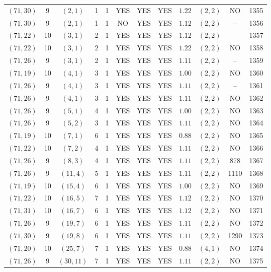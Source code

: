 \begin{longtable}{|c|c|c|c|c|c|c|c|c|c|c|c|}
$(71,30)$ & 9 & $(2,1)$ & 1 & 1 & YES & YES & YES & $1.22$ & $(2,2)$ & NO & 1355\\
$(71,30)$ & 9 & $(2,1)$ & 1 & 1 & NO & YES & YES & $1.12$ & $(2,2)$ & -- & 1356\\
$(71,22)$ & 10 & $(3,1)$ & 2 & 1 & YES & YES & YES & $1.12$ & $(2,2)$ & -- & 1357\\
$(71,22)$ & 10 & $(3,1)$ & 2 & 1 & YES & YES & YES & $1.22$ & $(2,2)$ & NO & 1358\\
$(71,26)$ & 9 & $(3,1)$ & 2 & 1 & YES & YES & YES & $1.11$ & $(2,2)$ & -- & 1359\\
$(71,19)$ & 10 & $(4,1)$ & 3 & 1 & YES & YES & YES & $1.00$ & $(2,2)$ & NO & 1360\\
$(71,26)$ & 9 & $(4,1)$ & 3 & 1 & YES & YES & YES & $1.11$ & $(2,2)$ & -- & 1361\\
$(71,26)$ & 9 & $(4,1)$ & 3 & 1 & YES & YES & YES & $1.11$ & $(2,2)$ & NO & 1362\\
$(71,26)$ & 9 & $(5,1)$ & 4 & 1 & YES & YES & YES & $1.00$ & $(2,2)$ & NO & 1363\\
$(71,26)$ & 9 & $(5,2)$ & 3 & 1 & YES & YES & YES & $1.11$ & $(2,2)$ & NO & 1364\\
$(71,19)$ & 10 & $(7,1)$ & 6 & 1 & YES & YES & YES & $0.88$ & $(2,2)$ & NO & 1365\\
$(71,22)$ & 10 & $(7,2)$ & 4 & 1 & YES & YES & YES & $1.11$ & $(2,2)$ & NO & 1366\\
$(71,26)$ & 9 & $(8,3)$ & 4 & 1 & YES & YES & YES & $1.11$ & $(2,2)$ & 878 & 1367\\
$(71,26)$ & 9 & $(11,4)$ & 5 & 1 & YES & YES & YES & $1.11$ & $(2,2)$ & 1110 & 1368\\
$(71,19)$ & 10 & $(15,4)$ & 6 & 1 & YES & YES & YES & $1.00$ & $(2,2)$ & NO & 1369\\
$(71,22)$ & 10 & $(16,5)$ & 7 & 1 & YES & YES & YES & $1.12$ & $(2,2)$ & NO & 1370\\
$(71,31)$ & 10 & $(16,7)$ & 6 & 1 & YES & YES & YES & $1.12$ & $(2,2)$ & NO & 1371\\
$(71,26)$ & 9 & $(19,7)$ & 6 & 1 & YES & YES & YES & $1.11$ & $(2,2)$ & NO & 1372\\
$(71,30)$ & 9 & $(19,8)$ & 6 & 1 & YES & YES & YES & $1.11$ & $(2,2)$ & 1290 & 1373\\
$(71,20)$ & 10 & $(25,7)$ & 7 & 1 & YES & YES & YES & $0.88$ & $(4,1)$ & NO & 1374\\
$(71,26)$ & 9 & $(30,11)$ & 7 & 1 & YES & YES & YES & $1.11$ & $(2,2)$ & NO & 1375\\

\end{longtable}

